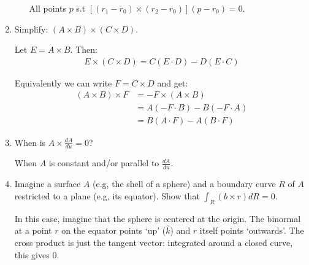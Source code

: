 \documentclass{article}
\begin{document}
\begin{enumerate}[1)]
\begin{enumerate}
                All points $p$ s.t
                $[(r_1 - r_0) \times (r_2 - r_0)](p - r_0) = 0$.
        \end{enumerate}

    \item Simplify: $(A \times B) \times (C \times D)$.

        Let $E = A \times B$. Then:
        \begin{align*}
            E \times (C \times D) = C(E \cdot D) - D(E \cdot C)
        \end{align*}

        Equivalently we can write $F = C \times D$ and get:
        \begin{align*}
            (A \times B) \times F &= -F \times (A \times B) \\
                                  &= A(-F \cdot B) - B(-F \cdot A) \\
                                  &= B(A \cdot F) - A(B \cdot F)
        \end{align*}

    \item When is $A \times \frac{dA}{du} = 0$?

        When $A$ is constant and/or parallel to $\frac{dA}{du}$.

    \item Imagine a surface $A$ (e.g, the shell of a sphere) and a boundary
        curve $R$ of $A$ restricted to a plane (e.g, its equator). Show that
        $\int_R (b \times r) dR = 0$.

        In this case, imagine that the sphere is centered at the origin. The
        binormal at a point $r$ on the equator points `up' ($\hat{k}$) and
        $r$ itself points `outwards'. The cross product is just the tangent
        vector: integrated around a closed curve, this gives 0.
\end{enumerate}
\end{document}
